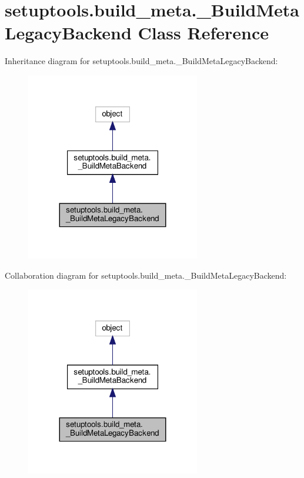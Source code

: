 \hypertarget{classsetuptools_1_1build__meta_1_1__BuildMetaLegacyBackend}{}\section{setuptools.\+build\+\_\+meta.\+\_\+\+Build\+Meta\+Legacy\+Backend Class Reference}
\label{classsetuptools_1_1build__meta_1_1__BuildMetaLegacyBackend}


Inheritance diagram for setuptools.\+build\+\_\+meta.\+\_\+\+Build\+Meta\+Legacy\+Backend\+:
\nopagebreak
\begin{figure}[H]
\begin{center}
\leavevmode
\includegraphics[width=215pt]{classsetuptools_1_1build__meta_1_1__BuildMetaLegacyBackend__inherit__graph}
\end{center}
\end{figure}


Collaboration diagram for setuptools.\+build\+\_\+meta.\+\_\+\+Build\+Meta\+Legacy\+Backend\+:
\nopagebreak
\begin{figure}[H]
\begin{center}
\leavevmode
\includegraphics[width=215pt]{classsetuptools_1_1build__meta_1_1__BuildMetaLegacyBackend__coll__graph}
\end{center}
\end{figure}
